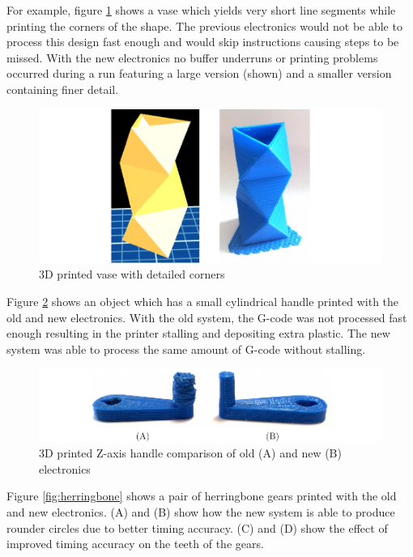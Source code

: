 				For example, figure \ref{fig:vase} shows a vase which yields very short
				line segments while printing the corners of the shape. The previous
				electronics would not be able to process this design fast enough and
				would skip instructions causing steps to be missed. With the new
				electronics no buffer underruns or printing problems occurred during a
				run featuring a large version (shown) and a smaller version containing
				finer detail.
				
				\begin{figure}
					\includegraphics[width=1\textwidth]{diagrams/vase.pdf}
					\caption{3D printed vase with detailed corners}
					\label{fig:vase}
				\end{figure}
				
				Figure \ref{fig:handle} shows an object which has a small cylindrical
				handle printed with the old and new electronics. With the old system,
				the G-code was not processed fast enough resulting in the printer
				stalling and depositing extra plastic. The new system was able to
				process the same amount of G-code without stalling.
				
				\begin{figure}
					\includegraphics[width=1\textwidth]{diagrams/handle.pdf}
					\caption[3D printed Z-axis handle comparison]{3D printed Z-axis handle
					comparison of old (A) and new (B) electronics}
					\label{fig:handle}
				\end{figure}
				
				Figure \ref{fig:herringbone} shows a pair of herringbone gears printed
				with the old and new electronics. (A) and (B) show how the new system is
				able to produce rounder circles due to better timing accuracy. (C) and
				(D) show the effect of improved timing accuracy on the teeth of the
				gears.
				
